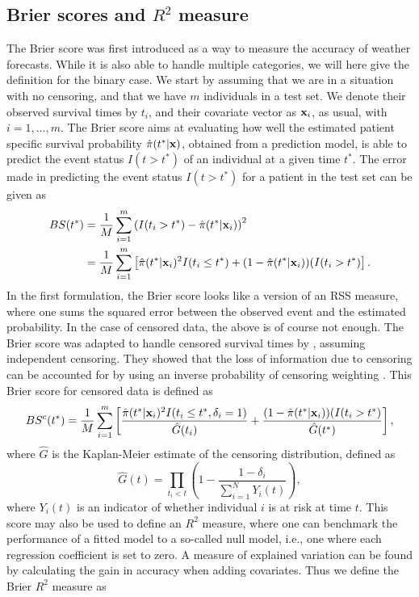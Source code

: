 \subsection{Brier scores and $R^2$ measure}
The Brier score \citep{brier1950} was first introduced as a way to measure the accuracy of weather forecasts. While it is also able to handle multiple categories, we will here give the definition for the binary case. We start by assuming that we are in a situation with no censoring, and that we have $m$ individuals in a test set. We denote their observed survival times by $t_i$, and their covariate vector as $\mathbf{x}_i$, as usual, with $i=1,\ldots,m$. The Brier score aims at evaluating how well the estimated patient specific survival probability $\hat{\pi}(t^*|\mathbf{x})$, obtained from a prediction model, is able to predict the event status $I(t>t^*)$ of an individual at a given time $t^*$. The error made in predicting the event status $I(t>t^*)$ for a patient in the test set can be given as
\begin{align*}
BS(t^*)&=\frac{1}{M}\sum_{i=1}^m\left(I(t_i>t^*)-\hat{\pi}(t^*|\mathbf{x}_i)\right)^2 \\
    &=\frac{1}{M}\sum_{i=1}^m\left[\hat{\pi}(t^*|\mathbf{x}_i)^2I(t_i\leq t^*)+(1-\hat{\pi}(t^*|\mathbf{x}_i))(I(t_i>t^*)\right].
\end{align*}
In the first formulation, the Brier score looks like a version of an RSS measure, where one sums the squared error between the observed event and the estimated probability. In the case of censored data, the above is of course not enough. The Brier score was adapted to handle censored survival times by \citet{graf}, assuming independent censoring. They showed that the loss of information due to censoring can be accounted for by using an inverse probability of censoring weighting \citep{bovelstadborgan}. This Brier score for censored data is defined as
\begin{equation*}
    BS^c(t^*)=\frac{1}{M}\sum_{i=1}^m\left[\frac{\hat{\pi}(t^*|\mathbf{x}_i)^2I(t_i\leq t^*,\delta_i=1)}{\hat{G}(t_i)}+\frac{(1-\hat{\pi}(t^*|\mathbf{x}_i))(I(t_i>t^*)}{\hat{G}(t^*)}\right],
\end{equation*}
where $\hat{G}$ is the Kaplan-Meier estimate of the censoring distribution, defined as
\begin{equation*}
    \hat{G}(t)=\prod_{t_i<t}\left(1-\frac{1-\delta_i}{\sum_{i=1}^NY_i(t)}\right),
\end{equation*}
where $Y_i(t)$ is an indicator of whether individual $i$ is at risk at time $t$. This score may also be used to define an $R^2$ measure, where one can benchmark the performance of a fitted model to a so-called null model, i.e., one where each regression coefficient is set to zero. A measure of explained variation can be found by calculating the gain in accuracy when adding covariates. Thus we define the Brier $R^2$ measure as
